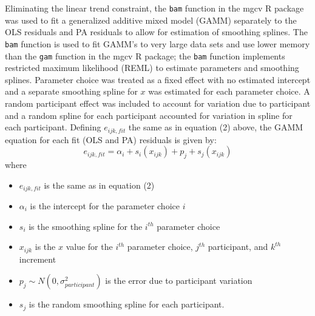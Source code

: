\documentclass[12pt]{article}
\providecommand{\tightlist}{%
  \setlength{\itemsep}{0pt}\setlength{\parskip}{0pt}}
\begin{document}
Eliminating the linear trend constraint, the \texttt{bam} function in
the mgcv R package \citep{mgcv_pkg} was used to fit a generalized
additive mixed model (GAMM) separately to the OLS residuals and PA
residuals to allow for estimation of smoothing splines. The \texttt{bam}
function is used to fit GAMM's to very large data sets and use lower
memory than the \texttt{gam} function in the mgcv R package; the
\texttt{bam} function implements restricted maximum likelihood (REML) to
estimate parameters and smoothing splines. Parameter choice was treated
as a fixed effect with no estimated intercept and a separate smoothing
spline for \(x\) was estimated for each parameter choice. A random
participant effect was included to account for variation due to
participant and a random spline for each participant accounted for
variation in spline for each participant. Defining \(e_{ijk,fit}\) the
same as in equation (2) above, the GAMM equation for each fit (OLS and
PA) residuals is given by: \begin{equation}
e_{ijk,fit} = \alpha_i + s_{i}(x_{ijk}) + p_{j} + s_{j}(x_{ijk})
\end{equation} \noindent where

\begin{itemize}
\tightlist
\item
  \(e_{ijk,fit}\) is the same as in equation (2)
\item
  \(\alpha_i\) is the intercept for the parameter choice \(i\)
\item
  \(s_{i}\) is the smoothing spline for the \(i^{th}\) parameter choice
\item
  \(x_{ijk}\) is the \(x\) value for the \(i^{th}\) parameter choice,
  \(j^{th}\) participant, and \(k^{th}\) increment
\item
  \(p_{j} \sim N(0, \sigma^2_{participant})\) is the error due to
  participant variation
\item
  \(s_{j}\) is the random smoothing spline for each participant.
\end{itemize}
\end{document}
